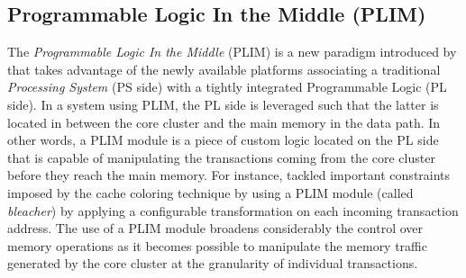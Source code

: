     \subsection{Programmable Logic In the Middle (PLIM)}
        The \emph{Programmable Logic In the Middle} (PLIM) is a new paradigm introduced by \cite{PLIM20} that takes advantage of the newly available platforms associating a traditional \emph{Processing System} (PS side) with a tightly integrated Programmable Logic (PL side).
        In a system using PLIM, the PL side is leveraged such that the latter is located in between the core cluster and the main memory in the data path.
        In other words, a PLIM module is a piece of custom logic located on the PL side that is capable of manipulating the transactions coming from the core cluster before they reach the main memory.
        For instance, \cite{PLIM20} tackled important constraints imposed by the cache coloring technique by using a PLIM module (called \emph{bleacher}) by applying a configurable transformation on each incoming transaction address.
        The use of a PLIM module broadens considerably the control over memory operations as it becomes possible to manipulate the memory traffic generated by the core cluster at the granularity of individual transactions.
